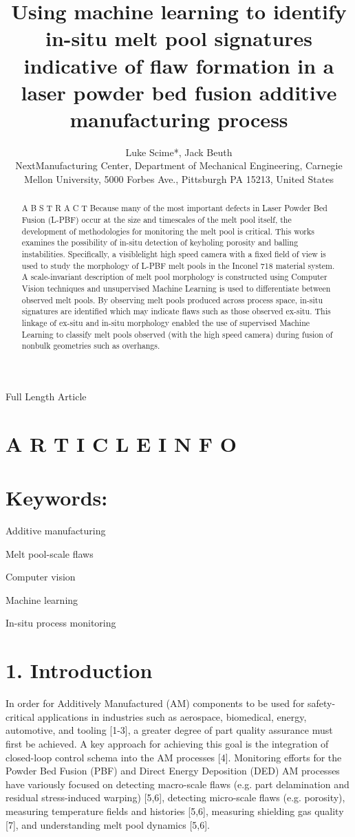 \documentclass[10pt]{article}
\title{Using machine learning to identify in-situ melt pool signatures indicative of flaw formation in a laser powder bed fusion additive manufacturing process }
\author{Luke Scime*, Jack Beuth\\
NextManufacturing Center, Department of Mechanical Engineering, Carnegie Mellon University, 5000 Forbes Ave., Pittsburgh PA 15213, United States}
\date{}
\begin{document}
\maketitle
Full Length Article



\section*{A R T I C L E I N F O}
\section*{Keywords:}
Additive manufacturing

Melt pool-scale flaws

Computer vision

Machine learning

In-situ process monitoring

\begin{abstract}
A B S T R A C T Because many of the most important defects in Laser Powder Bed Fusion (L-PBF) occur at the size and timescales of the melt pool itself, the development of methodologies for monitoring the melt pool is critical. This works examines the possibility of in-situ detection of keyholing porosity and balling instabilities. Specifically, a visiblelight high speed camera with a fixed field of view is used to study the morphology of L-PBF melt pools in the Inconel 718 material system. A scale-invariant description of melt pool morphology is constructed using Computer Vision techniques and unsupervised Machine Learning is used to differentiate between observed melt pools. By observing melt pools produced across process space, in-situ signatures are identified which may indicate flaws such as those observed ex-situ. This linkage of ex-situ and in-situ morphology enabled the use of supervised Machine Learning to classify melt pools observed (with the high speed camera) during fusion of nonbulk geometries such as overhangs.
\end{abstract}

\section*{1. Introduction}
In order for Additively Manufactured (AM) components to be used for safety-critical applications in industries such as aerospace, biomedical, energy, automotive, and tooling [1-3], a greater degree of part quality assurance must first be achieved. A key approach for achieving this goal is the integration of closed-loop control schema into the AM processes [4]. Monitoring efforts for the Powder Bed Fusion (PBF) and Direct Energy Deposition (DED) AM processes have variously focused on detecting macro-scale flaws (e.g. part delamination and residual stress-induced warping) [5,6], detecting micro-scale flaws (e.g. porosity), measuring temperature fields and histories [5,6], measuring shielding gas quality [7], and understanding melt pool dynamics [5,6].
\end{document}
